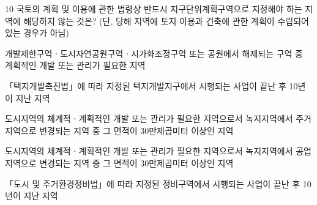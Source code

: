 \begin{question}{10}
국토의 계획 및 이용에 관한 법령상 반드시 지구단위계획구역으로 지정해야 하는 지역에 해당하지 않는 것은? (단, 당해 지역에 토지 이용과 건축에 관한 계획이 수립되어 있는 경우가 아님)
\begin{choices}
  \item 개발제한구역ㆍ도시자연공원구역ㆍ시가화조정구역 또는 공원에서 해제되는 구역 중 계획적인 개발 또는 관리가 필요한 지역
  \item 「택지개발촉진법」에 따라 지정된 택지개발지구에서 시행되는 사업이 끝난 후 10년이 지난 지역
  \item 도시지역의 체계적ㆍ계획적인 개발 또는 관리가 필요한 지역으로서 녹지지역에서 주거지역으로 변경되는 지역 중 그 면적이 30만제곱미터 이상인 지역
  \item 도시지역의 체계적ㆍ계획적인 개발 또는 관리가 필요한 지역으로서 녹지지역에서 공업지역으로 변경되는 지역 중 그 면적이 30만제곱미터 이상인 지역
  \item 「도시 및 주거환경정비법」에 따라 지정된 정비구역에서 시행되는 사업이 끝난 후 10년이 지난 지역
\end{choices}
\end{question}
